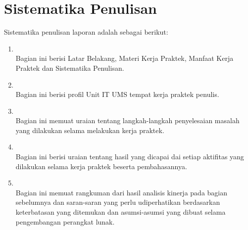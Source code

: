 \section{Sistematika Penulisan}
Sistematika penulisan laporan adalah sebagai berikut:
\begin{enumerate}[leftmargin=1.4cm,label=BAB \arabic*]
	\item  \babSatu \\Bagian ini berisi Latar Belakang, Materi Kerja Praktek, Manfaat Kerja Praktek dan Sistematika Penulisan.
	\item  \babDua \\Bagian ini berisi profil Unit IT UMS tempat kerja praktek penulis.
	\item  \babTiga \\Bagian ini memuat uraian tentang langkah-langkah penyelesaian masalah yang dilakukan selama melakukan kerja praktek.
	\item  \babEmpat \\Bagian ini berisi uraian tentang hasil yang dicapai dai setiap aktifitas yang dilakukan selama kerja praktek beserta pembahasannya. 
	\item  \kesimpulan \\Bagian ini memuat rangkuman dari hasil analisis kinerja pada bagian sebelumnya dan saran-saran yang perlu udiperhatikan berdasarkan keterbatasan yang ditemukan dan asumsi-asumsi yang dibuat selama pengembangan perangkat lunak.
\end{enumerate}

